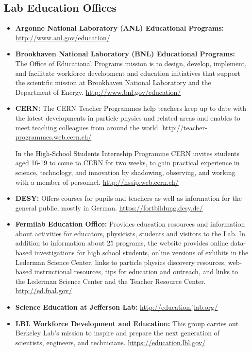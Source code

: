 \subsection{Lab Education Offices}\label{lab-education-offices}

\begin{itemize}
\item
  \textbf{Argonne National Laboratory (ANL) Educational Programs:}
  \url{http://www.anl.gov/education/}
\item
  \textbf{Brookhaven National Laboratory (BNL) Educational Programs:}
  The Office of Educational Programs mission is to design, develop,
  implement, and facilitate workforce development and education
  initiatives that support the scientific mission at Brookhaven National
  Laboratory and the Department of Energy.
  \url{http://www.bnl.gov/education/}
\item
  \textbf{CERN:} The CERN Teacher Programmes help teachers keep up to
  date with the latest developments in particle physics and related
  areas and enables to meet teaching colleagues from around the world.
  \url{http://teacher-programmes.web.cern.ch/}

  In the High-School Students Internship Programme CERN invites students
  aged 16-19 to come to CERN for two weeks, to gain practical experience
  in science, technology, and innovation by shadowing, observing, and
  working with a member of personnel. \url{http://hssip.web.cern.ch/}
\item
  \textbf{DESY:} Offers courses for pupils and teachers as well as
  information for the general public, mostly in German.
  \url{https://fortbildung.desy.de/}
\item
  \textbf{Fermilab Education Office:} Provides education resources and
  information about activities for educators, physicists, students and
  visitors to the Lab. In addition to information about 25 programs, the
  website provides online data-based investigations for high school
  students, online versions of exhibits in the Lederman Science Center,
  links to particle physics discovery resources, web-based instructional
  resources, tips for education and outreach, and links to the Lederman
  Science Center and the Teacher Resource Center.
  \url{http://ed.fnal.gov/}
\item
  \textbf{Science Education at Jefferson Lab:}
  \url{http://education.jlab.org/}
\item
  \textbf{LBL Workforce Development and Education:} This group carries
  out Berkeley Lab's mission to inspire and prepare the next generation
  of scientists, engineers, and technicians.
  \url{https://education.lbl.gov/}
\end{itemize}

